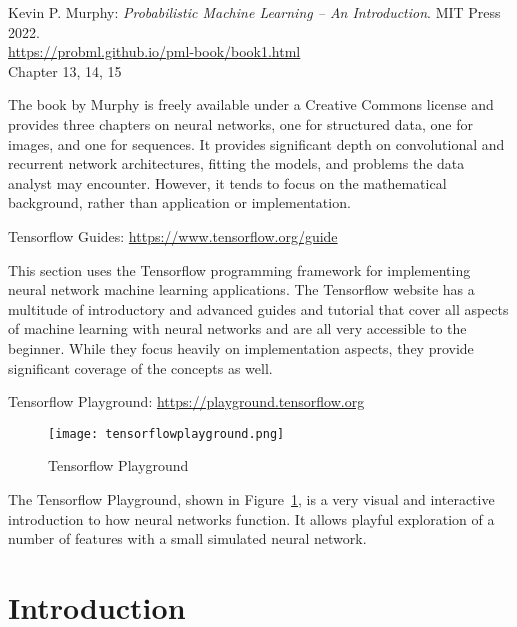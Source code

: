 \begin{tcolorbox}[colback=alert]
Kevin P. Murphy: \emph{Probabilistic Machine Learning -- An Introduction}. MIT Press 2022. \\

\url{https://probml.github.io/pml-book/book1.html} \\

Chapter 13, 14, 15
\end{tcolorbox}

The book by Murphy is freely available under a Creative Commons license and provides three chapters on neural networks, one for structured data, one for images, and one for sequences. It provides significant depth on convolutional and recurrent network architectures, fitting the models, and problems the data analyst may encounter. However, it tends to focus on the mathematical background, rather than application or implementation.

\begin{tcolorbox}[colback=alert]
Tensorflow Guides: \url{https://www.tensorflow.org/guide}
\end{tcolorbox}

This section uses the Tensorflow programming framework for implementing neural network machine learning applications. The Tensorflow website has a multitude of introductory and advanced guides and tutorial that cover all aspects of machine learning with neural networks and are all very accessible to the beginner. While they focus heavily on implementation aspects, they provide significant coverage of the concepts as well.

\begin{tcolorbox}[colback=alert]
Tensorflow Playground: \url{https://playground.tensorflow.org}
\end{tcolorbox}

\begin{figure}
\centering
\texttt{[image: tensorflowplayground.png]}
\caption{Tensorflow Playground}
\label{fig:tensorflowplayground}
\end{figure}

The Tensorflow Playground, shown in Figure~\ref{fig:tensorflowplayground}, is a very visual and interactive introduction to how neural networks function. It allows playful exploration of a number of features with a small simulated neural network.

\FloatBarrier

\section{Introduction}

